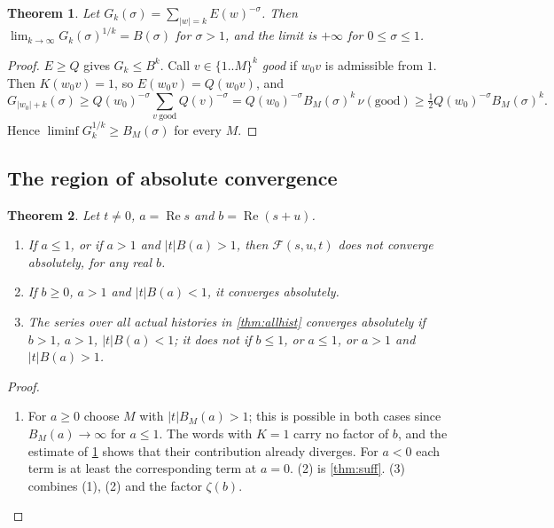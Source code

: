 \documentclass[11pt,a4paper]{article}
\newtheorem{theorem}{Theorem}[section]
\providecommand{\tightlist}{\setlength{\itemsep}{0pt}\setlength{\parskip}{0pt}}
\begin{document}
\begin{theorem}\label{thm:sharp}
Let \(G_k(\sigma)=\sum_{|w|=k}E(w)^{-\sigma}\). Then
\(\lim_{k\to\infty}G_k(\sigma)^{1/k}=B(\sigma)\) for \(\sigma>1\), and
the limit is \(+\infty\) for \(0\le\sigma\le1\).

\end{theorem}

\begin{proof}

\(E\ge Q\) gives \(G_k\le B^k\). Call \(v\in\{1..M\}^k\) \emph{good} if
\(w_0v\) is admissible from \(1\). Then \(K(w_0v)=1\), so
\(E(w_0v)=Q(w_0v)\), and
\[G_{|w_0|+k}(\sigma)\ge Q(w_0)^{-\sigma}\sum_{v\ \mathrm{good}}Q(v)^{-\sigma}=Q(w_0)^{-\sigma}B_M(\sigma)^k\,\nu(\mathrm{good})\ge\tfrac12Q(w_0)^{-\sigma}B_M(\sigma)^k .\]
Hence \(\liminf G_k^{1/k}\ge B_M(\sigma)\) for every \(M\).

\end{proof}

\subsection{The region of absolute
convergence}

\begin{theorem}\label{thm:region}
Let \(t\ne0\), \(a=\operatorname{Re}s\) and
\(b=\operatorname{Re}(s+u)\).

\begin{enumerate}
\def\labelenumi{\arabic{enumi}.}
\tightlist
\item
  If \(a\le1\), or if \(a>1\) and \(|t|B(a)>1\), then
  \(\mathcal F(s,u,t)\) does not converge absolutely, for any real
  \(b\).
\item
  If \(b\ge0\), \(a>1\) and \(|t|B(a)<1\), it converges absolutely.
\item
  The series over all actual histories in \cref{thm:allhist} converges absolutely if
  \(b>1\), \(a>1\), \(|t|B(a)<1\); it does not if \(b\le1\), or
  \(a\le1\), or \(a>1\) and \(|t|B(a)>1\).
\end{enumerate}

\end{theorem}

\begin{proof}

\begin{enumerate}
\def\labelenumi{(\arabic{enumi})}
\tightlist
\item
  For \(a\ge0\) choose \(M\) with \(|t|B_M(a)>1\); this is possible in
  both cases since \(B_M(a)\to\infty\) for \(a\le1\). The words with
  \(K=1\) carry no factor of \(b\), and the estimate of \cref{thm:sharp} shows that
  their contribution already diverges. For \(a<0\) each term is at least
  the corresponding term at \(a=0\). (2) is \cref{thm:suff}. (3) combines (1), (2)
  and the factor \(\zeta(b)\).
\end{enumerate}

\end{proof}
\end{document}
